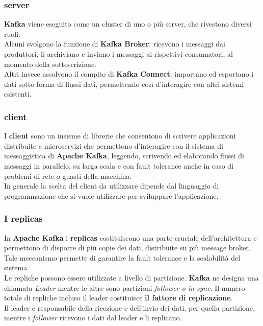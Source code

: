 \subsubsection{server}
\textbf{Kafka} viene eseguito come un cluster di uno o più server, che rivestono diversi ruoli. \\Alcuni svolgono la funzione di \textbf{Kafka Broker}: ricevono i messaggi dai produttori, li archiviano e inviano i messaggi ai rispettivi consumatori, al momento della sottoscrizione.
\\ Altri invece assolvono il compito di \textbf{Kafka Connect}: importano ed esportano i
dati sotto forma di flussi dati, permettendo così  d'interagire con altri sistemi esistenti.
\subsubsection{client}
I \textbf{client} sono un insieme di librerie che consentono di scrivere applicazioni distribuite e microservizi che permettono d'interagire con
il sistema di messaggistica di \textbf{Apache Kafka}, leggendo, scrivendo ed elaborando flussi di messaggi in parallelo, su larga scala e con \gls{fault tolerance}{} anche in caso di
problemi di rete o guasti della macchina.\\
In generale la scelta del client da utilizzare dipende dal linguaggio di programmazione che si vuole utilizzare per sviluppare l'applicazione.
\subsubsection{I replicas}
In \textbf{Apache Kafka} i \textbf{replicas} costituiscono una parte cruciale dell'architettura e permettono di disporre  di più copie dei dati, distribuite su
più \gls{message broker}{}. Tale meccanismo permette di garantire la \gls{fault tolerance}{} e la scalabilità del sistema.\\
Le repliche possono essere utilizzate a livello di partizione. \textbf{Kafka} ne designa una chiamata \textit{Leader}
mentre le altre sono partizioni \textit{follower o in-sync}. Il numero totale di repliche incluso il
leader costituisce \textbf{il fattore di replicazione}. \\
Il leader e responsabile della ricezione e dell’invio
dei dati, per quella partizione, mentre i \textit{follower} ricevono i dati dal leader e li replicano.\\
